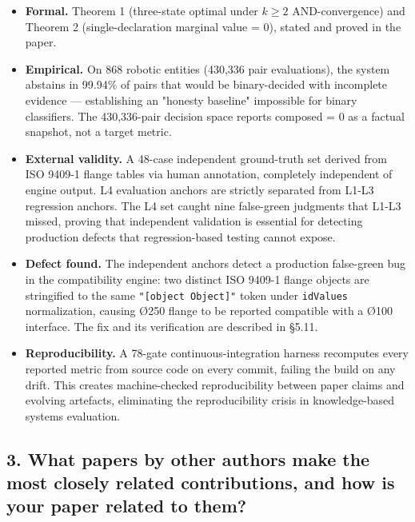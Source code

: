 \documentclass[11pt]{article}
\begin{document}
\begin{itemize}[leftmargin=*]
    \item \textbf{Formal.} Theorem 1 (three-state optimal under $k \ge 2$ AND-convergence) and Theorem 2 (single-declaration marginal value = 0), stated and proved in the paper.
    
    \item \textbf{Empirical.} On 868 robotic entities (430,336 pair evaluations), the system abstains in 99.94\% of pairs that would be binary-decided with incomplete evidence --- establishing an "honesty baseline" impossible for binary classifiers. The 430,336-pair decision space reports composed = 0 as a factual snapshot, not a target metric.
    
    \item \textbf{External validity.} A 48-case independent ground-truth set derived from ISO 9409-1 flange tables via human annotation, completely independent of engine output. L4 evaluation anchors are strictly separated from L1-L3 regression anchors. The L4 set caught nine false-green judgments that L1-L3 missed, proving that independent validation is essential for detecting production defects that regression-based testing cannot expose.
    
    \item \textbf{Defect found.} The independent anchors detect a production false-green bug in the compatibility engine: two distinct ISO 9409-1 flange objects are stringified to the same \texttt{"[object Object]"} token under \texttt{idValues} normalization, causing Ø250 flange to be reported compatible with a Ø100 interface. The fix and its verification are described in §5.11.
    
    \item \textbf{Reproducibility.} A 78-gate continuous-integration harness recomputes every reported metric from source code on every commit, failing the build on any drift. This creates machine-checked reproducibility between paper claims and evolving artefacts, eliminating the reproducibility crisis in knowledge-based systems evaluation.
\end{itemize}

\subsection*{3. What papers by other authors make the most closely related contributions, and how is your paper related to them?}
\end{document}
